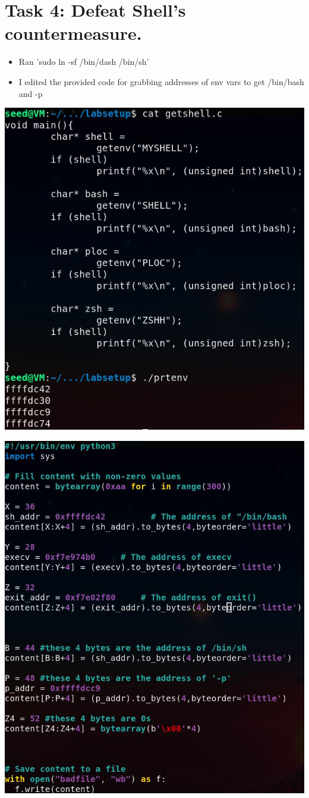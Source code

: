 \documentclass[11pt]{article}
\begin{document}
\section*{Task 4: Defeat Shell's countermeasure.}
\label{sec:orgc43c0b1}
\begin{itemize}
\item Ran 'sudo ln -sf /bin/dash /bin/sh'
\item I edited the provided code for grabbing addresses of env vars to get /bin/bash and -p
\end{itemize}
\begin{center}
\includegraphics[width=.9\linewidth]{./images/7.jpg}
\end{center}
\begin{center}
\includegraphics[width=.9\linewidth]{./images/6.jpg}
\end{center}
\end{document}
